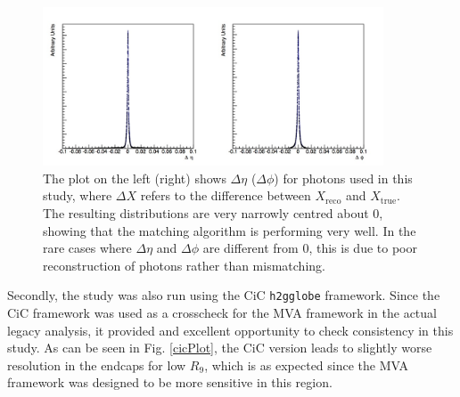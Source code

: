 \documentclass[10pt]{article}
\begin{document}
\begin{figure}[h!]
 \centering
\includegraphics[width=0.9\textwidth]{"Delta"}
\caption{ The plot on the left (right) shows $\Delta \eta$ ($\Delta \phi$) for photons used in this study, where $\Delta X$ refers to the difference between $X_{\text{reco}}$ and $X_{\text{true}}$. The resulting distributions are very narrowly centred about 0, showing that the matching algorithm is performing very well. In the rare cases where $\Delta \eta$ and $\Delta \phi$ are different from 0, this is due to poor reconstruction of photons rather than mismatching.}
\label{deltaPlots}
\end{figure}
Secondly, the study was also run using the CiC \texttt{h2gglobe} framework. Since the CiC framework was used as a crosscheck for the MVA framework in the actual legacy analysis, it provided and excellent opportunity to check consistency in this study. As can be seen in Fig. \ref{cicPlot}, the CiC version leads to slightly worse resolution in the endcaps for low $R_9$, which is as expected since the MVA framework was designed to be more sensitive in this region.
\end{document}
